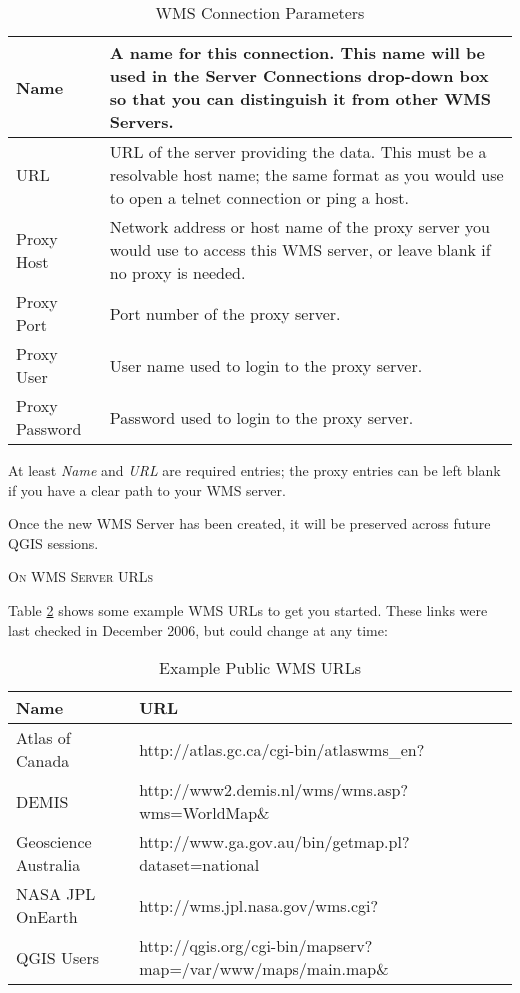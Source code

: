 \begin{table}[h]
\centering
\caption{WMS Connection Parameters}\label{tab:wms_connection_parms}\medskip
 \begin{tabular}{|l|p{5in}|}
\hline Name & A name for this connection.  This name will be used in the
 Server Connections drop-down box so that you can distinguish it from
 other WMS Servers. \\
\hline URL \index{WMS!URL} & URL of the server providing the data.
 This must be a resolvable host name; the same format as you would use 
 to open a telnet connection or ping a host. \\
\hline Proxy Host & Network address or host name of the proxy server
 you would use to access this WMS server, or leave blank if no proxy is needed. \\
\hline Proxy Port & Port number of the proxy server. \\
\hline Proxy User & User name used to login to the proxy server. \\
\hline Proxy Password & Password used to login to the proxy server. \\
\hline
\end{tabular}
\end{table}

At least \textsl{Name} and \textsl{URL} are required entries; the proxy entries 
can be left blank if you have a clear path to your WMS server.

Once the new WMS Server has been created, it will be preserved across future 
QGIS sessions.

\begin{Tip}[h]\caption{\textsc{On WMS Server URLs}}
\end{Tip}

Table \ref{tab:wms_example_urls} shows some example WMS URLs to get you started.
These links were last checked in December 2006, but could change at any time:

\begin{table}[h]
\centering
\caption{Example Public WMS URLs}\label{tab:wms_example_urls}\medskip
 \begin{tabular}{|l|l|}
\hline \textbf{Name}        & \textbf{URL} \\
\hline Atlas of Canada      & http://atlas.gc.ca/cgi-bin/atlaswms\_en? \\
\hline DEMIS                & http://www2.demis.nl/wms/wms.asp?wms=WorldMap\& \\
\hline Geoscience Australia & http://www.ga.gov.au/bin/getmap.pl?dataset=national \\
\hline NASA JPL OnEarth     & http://wms.jpl.nasa.gov/wms.cgi? \\
\hline QGIS Users           & http://qgis.org/cgi-bin/mapserv?map=/var/www/maps/main.map\& \\
\hline
\end{tabular}
\end{table}

